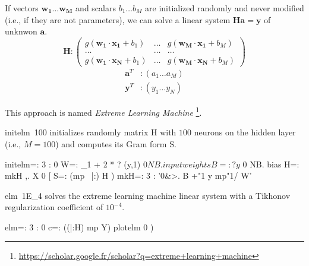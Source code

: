 \documentclass[10pt]{article}%
\renewcommand{\vec}[1]{\boldsymbol{#1}}
\begin{document}
If vectors $\vec{w_1}\dots\vec{w_M}$ and scalars $b_1\dots b_M$ are initialized
randomly and never modified (i.e., if they are not parameters), we can solve a
linear system $\vec{H}\vec{a}=\vec{y}$ of unknwon $\vec{a}$.
\[
\vec{H}:
\left( \begin{array}{ccc}
g(\vec{w_1}\cdot\vec{x_1}+b_1) & \dots & g(\vec{w_M}\cdot\vec{x_1}+b_M) \\
\dots & \dots & \dots \\
g(\vec{w_1}\cdot\vec{x_N}+b_1) & \dots & g(\vec{w_M}\cdot\vec{x_N}+b_M)
\end{array} \right)
\]
\begin{align*}
\vec{a}^T &: \left(a_1 \dots a_M\right) \\
\vec{y}^T &: \left(y_1 \dots y_N\right)
\end{align*}

This approach is named \emph{Extreme Learning Machine}
\footnote{\url{https://scholar.google.fr/scholar?q=extreme+learning+machine}}.

{\Tt{}initelm\ 100\nwendquote} initializes randomly matrix H with $100$ neurons on the hidden
layer (i.e., $M=100$) and computes its Gram form {\Tt{}S\nwendquote}.

\nwenddocs{}\endmoddef\nwstartdeflinemarkup{}\nwenddeflinemarkup
initelm=: 3 : 0
  W=: _1 + 2 * ? (y,1) $ 0 NB. input weights
  B=: ? y $ 0 NB. bias
  H=: mkH ,. X
  0 [ S=: (mp~ |:) H
)
mkH=: 3 : '0&>. B +"1 y mp"1/ W'

\nwendcode{}\nwdocspar
{\Tt{}elm\ 1E{\_}4\nwendquote} solves the extreme learning machine linear system with a Tikhonov
regularization coefficient of $10^{-4}$.

\nwenddocs{}\plusendmoddef\nwstartdeflinemarkup{}\nwenddeflinemarkup
elm=: 3 : 0
  c=: ((|:H) mp Y) %
  plotelm 0
)
\end{document}
